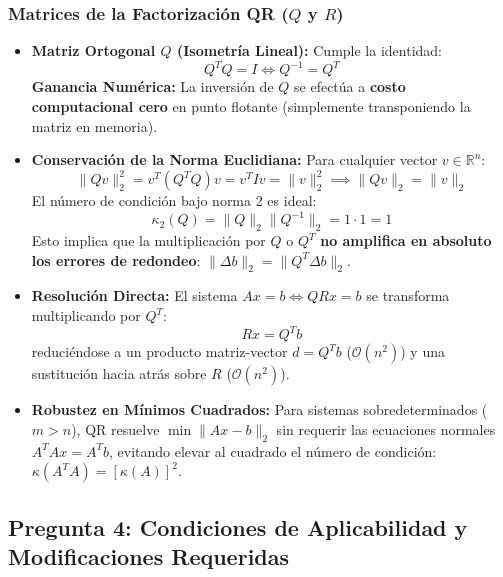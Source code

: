 \documentclass[11pt,a4paper]{article}
\theoremstyle{definition}
\theoremstyle{remark}
\begin{document}
\subsubsection{Matrices de la Factorización QR ($Q$ y $R$)}
\begin{itemize}[leftmargin=*]
    \item \textbf{Matriz Ortogonal $Q$ (Isometría Lineal):} Cumple la identidad:
    \begin{equation}
        Q^T Q = I \iff Q^{-1} = Q^T
    \end{equation}
    \textbf{Ganancia Numérica:} La inversión de $Q$ se efectúa a \textbf{costo computacional cero} en punto flotante (simplemente transponiendo la matriz en memoria).
    \item \textbf{Conservación de la Norma Euclidiana:} Para cualquier vector $v \in \mathbb{R}^n$:
    \begin{equation}
        \|Q v\|_2^2 = v^T (Q^T Q) v = v^T I v = \|v\|_2^2 \implies \|Q v\|_2 = \|v\|_2
    \end{equation}
    El número de condición bajo norma 2 es ideal:
    \begin{equation}
        \kappa_2(Q) = \|Q\|_2 \|Q^{-1}\|_2 = 1 \cdot 1 = 1
    \end{equation}
    Esto implica que la multiplicación por $Q$ o $Q^T$ \textbf{no amplifica en absoluto los errores de redondeo}: $\|\Delta b\|_2 = \|Q^T \Delta b\|_2$.
    \item \textbf{Resolución Directa:} El sistema $Ax = b \iff QRx = b$ se transforma multiplicando por $Q^T$:
    \begin{equation}
        R x = Q^T b
    \end{equation}
    reduciéndose a un producto matriz-vector $d = Q^T b$ ($\mathcal{O}(n^2)$) y una sustitución hacia atrás sobre $R$ ($\mathcal{O}(n^2)$).
    \item \textbf{Robustez en Mínimos Cuadrados:} Para sistemas sobredeterminados ($m > n$), QR resuelve $\min \|Ax - b\|_2$ sin requerir las ecuaciones normales $A^T A x = A^T b$, evitando elevar al cuadrado el número de condición: $\kappa(A^T A) = [\kappa(A)]^2$.
\end{itemize}

\subsection{Pregunta 4: Condiciones de Aplicabilidad y Modificaciones Requeridas}
\end{document}
